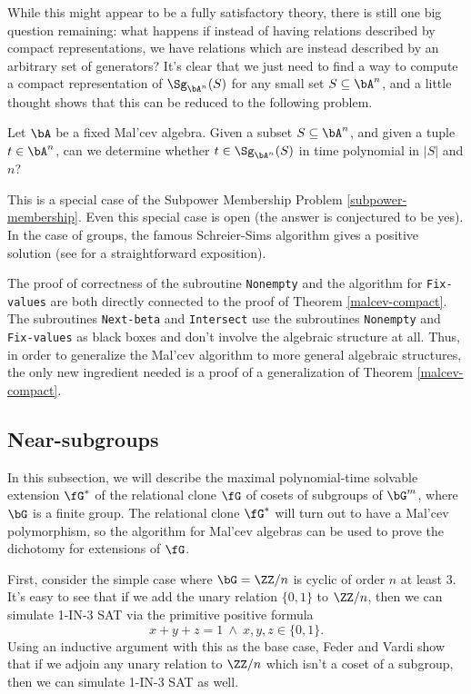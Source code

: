 While this might appear to be a fully satisfactory theory, there is still one big question remaining: what happens if instead of having relations described by compact representations, we have relations which are instead described by an arbitrary set of generators? It's clear that we just need to find a way to compute a compact representation of $\Sg_{\bA^n}(S)$ for any small set $S \subseteq \bA^n$, and a little thought shows that this can be reduced to the following problem.

\begin{prob} Let $\bA$ be a fixed Mal'cev algebra. Given a subset $S \subseteq \bA^n$, and given a tuple $t \in \bA^n$, can we determine whether $t \in \Sg_{\bA^n}(S)$ in time polynomial in $|S|$ and $n$?
\end{prob}

This is a special case of the Subpower Membership Problem \ref{subpower-membership}. Even this special case is open (the answer is conjectured to be yes). In the case of groups, the famous Schreier-Sims algorithm gives a positive solution (see \cite{group-algorithms} for a straightforward exposition).

\begin{rem} The proof of correctness of the subroutine \texttt{Nonempty} and the algorithm for \texttt{Fix-values} are both directly connected to the proof of Theorem \ref{malcev-compact}. The subroutines \texttt{Next-beta} and \texttt{Intersect} use the subroutines \texttt{Nonempty} and \texttt{Fix-values} as black boxes and don't involve the algebraic structure at all. Thus, in order to generalize the Mal'cev algorithm to more general algebraic structures, the only new ingredient needed is a proof of a generalization of Theorem \ref{malcev-compact}.
\end{rem}


\subsection{Near-subgroups}

In this subsection, we will describe the maximal polynomial-time solvable extension $\fG^*$ of the relational clone $\fG$ of cosets of subgroups of $\bG^m$, where $\bG$ is a finite group. The relational clone $\fG^*$ will turn out to have a Mal'cev polymorphism, so the algorithm for Mal'cev algebras can be used to prove the dichotomy for extensions of $\fG$.

First, consider the simple case where $\bG = \ZZ/n$ is cyclic of order $n$ at least $3$. It's easy to see that if we add the unary relation $\{0,1\}$ to $\ZZ/n$, then we can simulate 1-IN-3 SAT via the primitive positive formula
\[
x+y+z = 1\ \wedge\ x,y,z \in \{0,1\}.
\]
Using an inductive argument with this as the base case, Feder and Vardi \cite{feder-vardi} show that if we adjoin any unary relation to $\ZZ/n$ which isn't a coset of a subgroup, then we can simulate 1-IN-3 SAT as well.%

